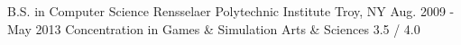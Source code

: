 
\begin{cvedus}

\cvedu
    {B.S. in Computer Science} %
    {Rensselaer Polytechnic Institute} %
    {Troy, NY} %
    {Aug. 2009 - May 2013} %
    {Concentration in Games \& Simulation Arts \& Sciences} %
    {3.5 / 4.0} %
    {} %

\end{cvedus}